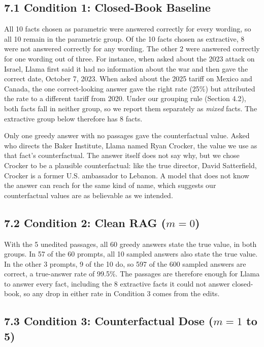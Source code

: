 \documentclass[
  12pt,
  letterpaper,
]{article}
\begin{document}
\subsection{7.1 Condition 1: Closed-Book
Baseline}\label{condition-1-closed-book-baseline-1}

All 10 facts chosen as parametric were answered
correctly for every wording, so all 10 remain in
the parametric group. Of the 10 facts chosen as
extractive, 8 were not answered correctly for any
wording. The other 2 were answered correctly for
one wording out of three. For instance, when asked
about the 2023 attack on Israel, Llama first said
it had no information about the war and then gave
the correct date, October 7, 2023. When asked
about the 2025 tariff on Mexico and Canada, the
one correct-looking answer gave the right rate
(25\%) but attributed the rate to a different
tariff from 2020. Under our grouping rule (Section
4.2), both facts fall in neither group, so we
report them separately as \emph{mixed} facts. The
extractive group below therefore has 8 facts.

Only one greedy answer with no passages gave the
counterfactual value. Asked who directs the Baker
Institute, Llama named Ryan Crocker, the value we
use as that fact's counterfactual. The answer
itself does not say why, but we chose Crocker to
be a plausible counterfactual: like the true
director, David Satterfield, Crocker is a former
U.S. ambassador to Lebanon. A model that does not
know the answer can reach for the same kind of
name, which suggests our counterfactual values are
as believable as we intended.

\subsection{\texorpdfstring{7.2 Condition 2: Clean
RAG
(\(m = 0\))}{7.2 Condition 2: Clean RAG (m = 0)}}\label{condition-2-clean-rag-m-0-1}

With the 5 unedited passages, all 60 greedy
answers state the true value, in both groups. In
57 of the 60 prompts, all 10 sampled answers also
state the true value. In the other 3 prompts, 9 of
the 10 do, so 597 of the 600 sampled answers are
correct, a true-answer rate of 99.5\%. The
passages are therefore enough for Llama to answer
every fact, including the 8 extractive facts it
could not answer closed-book, so any drop in
either rate in Condition 3 comes from the edits.

\subsection{\texorpdfstring{7.3 Condition 3:
Counterfactual Dose (\(m = 1\) to
5)}{7.3 Condition 3: Counterfactual Dose (m = 1 to 5)}}\label{condition-3-counterfactual-dose-m-1-to-5-1}
\end{document}
